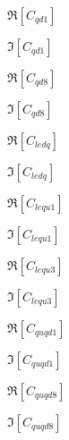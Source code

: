 \documentclass{article}
\begin{document}
$ \Re \left[ C_{qd1} \right]$
\pagebreak

$ \Im \left[ C_{qd1} \right]$
\pagebreak

$ \Re \left[ C_{qd8} \right]$
\pagebreak

$ \Im \left[ C_{qd8} \right]$
\pagebreak

$ \Re \left[ C_{ledq} \right]$
\pagebreak

$ \Im \left[ C_{ledq} \right]$
\pagebreak

$ \Re \left[ C_{lequ1} \right]$
\pagebreak

$ \Im \left[ C_{lequ1} \right]$
\pagebreak

$ \Re \left[ C_{lequ3} \right]$
\pagebreak

$ \Im \left[ C_{lequ3} \right]$
\pagebreak

$ \Re \left[ C_{quqd1} \right]$
\pagebreak

$ \Im \left[ C_{quqd1} \right]$
\pagebreak

$ \Re \left[ C_{quqd8} \right]$
\pagebreak

$ \Im \left[ C_{quqd8} \right]$
\pagebreak
\end{document}
